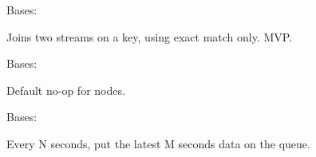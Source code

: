 \documentclass[letterpaper,10pt,english]{sphinxmanual}
\begin{document}
\begin{fulllineitems}
\label{\detokenize{api:nanostream.node.StreamingJoin}}
Bases: {\hyperref[\detokenize{api:nanostream.node.NanoNode}]{}}

Joins two streams on a key, using exact match only. MVP.

\begin{fulllineitems}
\label{\detokenize{api:nanostream.node.StreamingJoin.process_item}}
\end{fulllineitems}


\end{fulllineitems}


\begin{fulllineitems}
\label{\detokenize{api:nanostream.node.SubstituteRegex}}
Bases: {\hyperref[\detokenize{api:nanostream.node.NanoNode}]{}}

\begin{fulllineitems}
\label{\detokenize{api:nanostream.node.SubstituteRegex.process_item}}
Default no-op for nodes.

\end{fulllineitems}


\end{fulllineitems}


\begin{fulllineitems}
\label{\detokenize{api:nanostream.node.TimeWindowAccumulator}}
Bases: {\hyperref[\detokenize{api:nanostream.node.NanoNode}]{}}

Every N seconds, put the latest M seconds data on the queue.

\end{fulllineitems}
\end{document}
